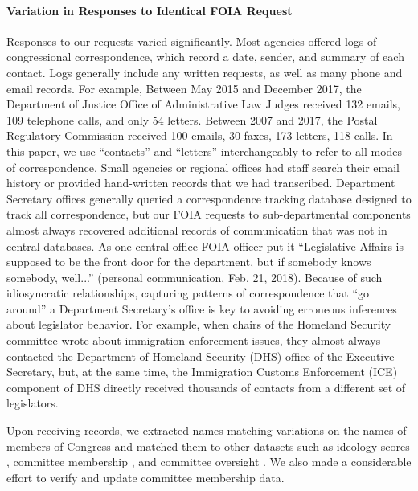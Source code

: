 \documentclass{article}
\begin{document}
\paragraph{Variation in Responses to Identical FOIA Request} Responses to our requests varied significantly. Most agencies offered logs of congressional correspondence, which record a date, sender, and summary of each contact. Logs generally include any written requests, as well as many phone and email records. For example, Between May 2015 and December 2017, the Department of Justice Office of Administrative Law Judges received 132 emails, 109 telephone calls, and only 54 letters. Between 2007 and 2017, the Postal Regulatory Commission received 100 emails, 30 faxes, 173 letters, 118 calls. In this paper, we use ``contacts'' and ``letters'' interchangeably to refer to all modes of correspondence. 
Small agencies or regional offices had staff search their email history or provided hand-written records that we had transcribed. 
Department Secretary offices generally queried a correspondence tracking database designed to track all correspondence, but our FOIA requests to sub-departmental components almost always recovered additional records of communication that was not in central databases. As one central office FOIA officer put it ``Legislative Affairs is supposed to be the front door for the department, but if somebody knows somebody, well...'' (personal communication, Feb. 21, 2018). Because of such idiosyncratic relationships, capturing patterns of correspondence that ``go around'' a Department Secretary's office is key to avoiding erroneous inferences about legislator behavior. For example, when chairs of the Homeland Security committee wrote about immigration enforcement issues, they almost always contacted the Department of Homeland Security (DHS) office of the Executive Secretary, but, at the same time, the Immigration Customs Enforcement (ICE) component of DHS directly received thousands of contacts from a different set of legislators. 

Upon receiving records, we extracted names matching variations on the names of members of Congress and matched them to other datasets such as ideology scores \citep{dwnominate2018}, committee membership \citep{StewartWoon2017}, and committee oversight \citep{LewisSelin2012}. We also made a considerable effort to verify and update committee membership data. 
\end{document}
